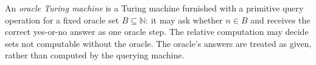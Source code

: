
An \emph{oracle Turing machine} is a Turing machine furnished with a primitive query operation for a fixed oracle set $B\subseteq\mathbb N$: it may ask whether $n\in B$ and receives the correct yes-or-no answer as one oracle step. The relative computation may decide sets not computable without the oracle. The oracle's answers are treated as given, rather than computed by the querying machine.
